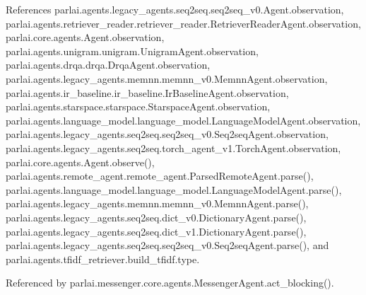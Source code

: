 References parlai.\+agents.\+legacy\+\_\+agents.\+seq2seq.\+seq2seq\+\_\+v0.\+Agent.\+observation, parlai.\+agents.\+retriever\+\_\+reader.\+retriever\+\_\+reader.\+Retriever\+Reader\+Agent.\+observation, parlai.\+core.\+agents.\+Agent.\+observation, parlai.\+agents.\+unigram.\+unigram.\+Unigram\+Agent.\+observation, parlai.\+agents.\+drqa.\+drqa.\+Drqa\+Agent.\+observation, parlai.\+agents.\+legacy\+\_\+agents.\+memnn.\+memnn\+\_\+v0.\+Memnn\+Agent.\+observation, parlai.\+agents.\+ir\+\_\+baseline.\+ir\+\_\+baseline.\+Ir\+Baseline\+Agent.\+observation, parlai.\+agents.\+starspace.\+starspace.\+Starspace\+Agent.\+observation, parlai.\+agents.\+language\+\_\+model.\+language\+\_\+model.\+Language\+Model\+Agent.\+observation, parlai.\+agents.\+legacy\+\_\+agents.\+seq2seq.\+seq2seq\+\_\+v0.\+Seq2seq\+Agent.\+observation, parlai.\+agents.\+legacy\+\_\+agents.\+seq2seq.\+torch\+\_\+agent\+\_\+v1.\+Torch\+Agent.\+observation, parlai.\+core.\+agents.\+Agent.\+observe(), parlai.\+agents.\+remote\+\_\+agent.\+remote\+\_\+agent.\+Parsed\+Remote\+Agent.\+parse(), parlai.\+agents.\+language\+\_\+model.\+language\+\_\+model.\+Language\+Model\+Agent.\+parse(), parlai.\+agents.\+legacy\+\_\+agents.\+memnn.\+memnn\+\_\+v0.\+Memnn\+Agent.\+parse(), parlai.\+agents.\+legacy\+\_\+agents.\+seq2seq.\+dict\+\_\+v0.\+Dictionary\+Agent.\+parse(), parlai.\+agents.\+legacy\+\_\+agents.\+seq2seq.\+dict\+\_\+v1.\+Dictionary\+Agent.\+parse(), parlai.\+agents.\+legacy\+\_\+agents.\+seq2seq.\+seq2seq\+\_\+v0.\+Seq2seq\+Agent.\+parse(), and parlai.\+agents.\+tfidf\+\_\+retriever.\+build\+\_\+tfidf.\+type.



Referenced by parlai.\+messenger.\+core.\+agents.\+Messenger\+Agent.\+act\+\_\+blocking().


